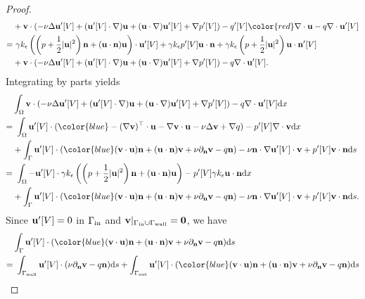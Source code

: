 \documentclass[oneside,11pt]{book}
\numberwithin{equation}{section}
\begin{document}
\begin{proof}
\begin{align}
        &+ {\bf v}\cdot(-\nu\Delta{\bf u}'[V] + ({\bf u}'[V]\cdot\nabla){\bf u} + ({\bf u}\cdot\nabla){\bf u}'[V] + \nabla p'[V]) - q'[V]{\color{red} \nabla\cdot{\bf u}} - q\nabla\cdot{\bf u}'[V]\\
        =&\ \gamma k_\epsilon\left(\left(p + \frac{1}{2}|{\bf u}|^2\right){\bf n} + ({\bf u}\cdot{\bf n}){\bf u}\right)\cdot{\bf u}'[V] + \gamma k_\epsilon p'[V]{\bf u}\cdot{\bf n} + \gamma k_\epsilon\left(p + \frac{1}{2}|{\bf u}|^2\right){\bf u}\cdot{\bf n}'[V] \\
        &+ {\bf v}\cdot(-\nu\Delta{\bf u}'[V] + ({\bf u}'[V]\cdot\nabla){\bf u} + ({\bf u}\cdot\nabla){\bf u}'[V] + \nabla p'[V]) - q\nabla\cdot{\bf u}'[V].
    \end{align}
    Integrating by parts yields
    \begin{align}
        &\int_\Omega {\bf v}\cdot(-\nu\Delta{\bf u}'[V] + ({\bf u}'[V]\cdot\nabla){\bf u} + ({\bf u}\cdot\nabla){\bf u}'[V] + \nabla p'[V]) - q\nabla\cdot{\bf u}'[V]{\rm d}x\\
        =&\ \int_\Omega {\bf u}'[V]\cdot({\color{blue} -(\nabla{\bf v})^\top\cdot{\bf u} - \nabla{\bf v}\cdot{\bf u} -\nu\Delta{\bf v} + \nabla q) - p'[V]\nabla\cdot{\bf v}} {\rm d}x\\
        &+ \int_\Gamma {\bf u}'[V]\cdot({\color{blue} ({\bf v}\cdot{\bf u}){\bf n} + ({\bf u}\cdot{\bf n}){\bf v} + \nu\partial_{\bf n}{\bf v} - q{\bf n}}) - \nu{\bf n}\cdot\nabla{\bf u}'[V]\cdot{\bf v} + p'[V]{\bf v}\cdot{\bf n}{\rm d}s\\
        =&\ \int_\Omega -{\bf u}'[V]\cdot\gamma k_\epsilon\left(\left(p + \frac{1}{2}|{\bf u}|^2\right){\bf n} + ({\bf u}\cdot{\bf n}){\bf u}\right) - p'[V]\gamma k_\epsilon{\bf u}\cdot{\bf n}{\rm d}x\\
        &+ \int_\Gamma {\bf u}'[V]\cdot({\color{blue} ({\bf v}\cdot{\bf u}){\bf n} + ({\bf u}\cdot{\bf n}){\bf v} + \nu\partial_{\bf n}{\bf v} - q{\bf n}}) - \nu{\bf n}\cdot\nabla{\bf u}'[V]\cdot{\bf v} + p'[V]{\bf v}\cdot{\bf n}{\rm d}s.
    \end{align}
    Since ${\bf u}'[V] = 0$ in $\Gamma_{\rm in}$ and ${\bf v}|_{\Gamma_{\rm in}\cup\Gamma_{\rm wall}} = {\bf 0}$, we have
    \begin{align}
        &\int_\Gamma {\bf u}'[V]\cdot({\color{blue} ({\bf v}\cdot{\bf u}){\bf n} + ({\bf u}\cdot{\bf n}){\bf v} + \nu\partial_{\bf n}{\bf v} - q{\bf n}}){\rm d}s\\
        =&\ \int_{\Gamma_{\rm wall}} {\bf u}'[V]\cdot(\nu\partial_{\bf n}{\bf v} - q{\bf n}){\rm d}s + \int_{\Gamma_{\rm out}} {\bf u}'[V]\cdot({\color{blue} ({\bf v}\cdot{\bf u}){\bf n} + ({\bf u}\cdot{\bf n}){\bf v} + \nu\partial_{\bf n}{\bf v} - q{\bf n}}){\rm d}s\\

\end{align}
\end{proof}
\end{document}
